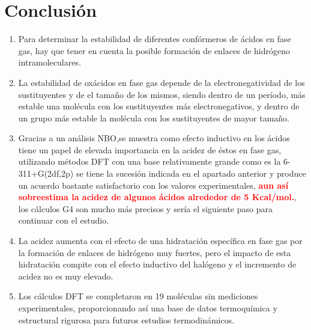 \chapter{Conclusión}

\begin{enumerate}
	\item Para determinar la estabilidad de diferentes confórmeros de ácidos en fase gas, hay que tener en cuenta la posible formación de enlaces de hidrógeno intramoleculares.
	\item La estabilidad de oxácidos en fase gas depende de la electronegatividad de los sustituyentes y de el tamaño de los mismos, siendo dentro de un período, más estable una molécula con los sustituyentes más electronegativos, y dentro de un grupo más estable la molécula con los sustituyentes de mayor tamaño.
	\item Gracias a un análisis NBO,se muestra como efecto inductivo en los ácidos tiene un papel de elevada importancia en la acidez de éstos en fase gas, utilizando métodos DFT con una base relativamente grande como es la 6-311+G(2df,2p) se tiene la sucesión indicada en el apartado anterior y produce un acuerdo bastante satisfactorio con los valores experimentales,  {\bfseries\textcolor{red} {aun así sobreestima la acidez de algunos ácidos alrededor de 5 Kcal/mol.}}, los cálculos G4 son mucho más precisos y sería el siguiente paso para continuar con el estudio.
	\item La acidez aumenta con el efecto de una hidratación específica en fase gas por la formación de enlaces de hidrógeno muy fuertes, pero el impacto de esta hidratación compite con el efecto inductivo del halógeno y el incremento de acidez no es muy elevado.
	\item Los cálculos DFT se completaron en 19 moléculas sin mediciones experimentales, proporcionando así una base de datos termoquímica y estructural rigurosa para futuros estudios termodinámicos.
	
	
\end{enumerate}